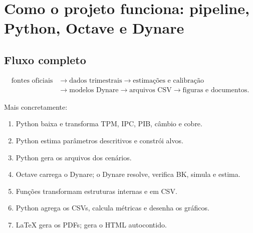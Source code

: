 \documentclass[11pt,a4paper]{article}
\begin{document}
\section{Como o projeto funciona: pipeline, Python, Octave e Dynare}

\subsection{Fluxo completo}
\[
\begin{aligned}
\text{fontes oficiais} &\longrightarrow \text{dados trimestrais}
\longrightarrow \text{estimações e calibração}\\
&\longrightarrow \text{modelos Dynare}
\longrightarrow \text{arquivos CSV}
\longrightarrow \text{figuras e documentos}.
\end{aligned}
\]

Mais concretamente:
\begin{enumerate}[nosep]
  \item Python baixa e transforma TPM, IPC, PIB, câmbio e cobre.
  \item Python estima parâmetros descritivos e constrói alvos.
  \item Python gera os arquivos  dos cenários.
  \item Octave carrega o Dynare; o Dynare resolve, verifica BK, simula e estima.
  \item Funções  transformam estruturas internas  e  em CSV.
  \item Python agrega os CSVs, calcula métricas e desenha os gráficos.
  \item LaTeX gera os PDFs;  gera o HTML autocontido.
\end{enumerate}
\end{document}
